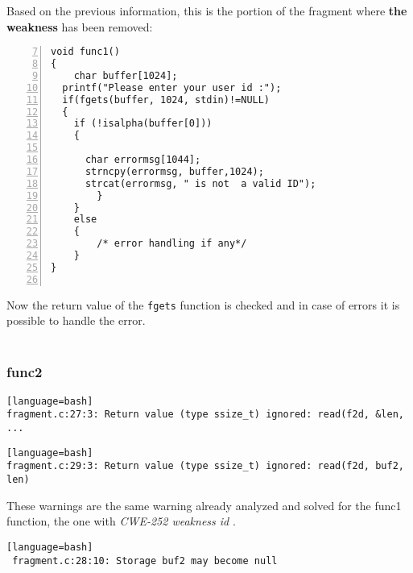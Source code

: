 \documentclass[a4paper,12pt]{article}
\begin{document}
\noindent
Based on the previous information, this is the portion of the fragment where \textbf{the weakness} has been removed:
\begin{lstlisting}[style=c,numbers=left,firstnumber=7,linebackgroundcolor={
\ifnum\value{lstnumber}=11\color{green}\fi}]
void func1()
{	
	char buffer[1024];
  printf("Please enter your user id :");
  if(fgets(buffer, 1024, stdin)!=NULL)
  {
  	if (!isalpha(buffer[0]))
  	{

      char errormsg[1044];
      strncpy(errormsg, buffer,1024);
      strcat(errormsg, " is not  a valid ID");
 		}
 	}
 	else
 	{
		/* error handling if any*/ 
	}
}


\end{lstlisting}
Now the return value of the \texttt{fgets} function is checked and in case of errors it is possible to handle the error.\\\\


\noindent
\subsubsection{func2}

\begin{lstlisting}[style=DOS][language=bash]
fragment.c:27:3: Return value (type ssize_t) ignored: read(f2d, &len, ...
\end{lstlisting}



\begin{lstlisting}[style=DOS][language=bash]
fragment.c:29:3: Return value (type ssize_t) ignored: read(f2d, buf2, len)

\end{lstlisting}
These warnings are the same warning already analyzed and solved for the func1 function, the one with \textit{CWE-252 weakness id} \cite{CWE252}.
\begin{lstlisting}[style=DOS][language=bash]
 fragment.c:28:10: Storage buf2 may become null
\end{lstlisting}
\end{document}
